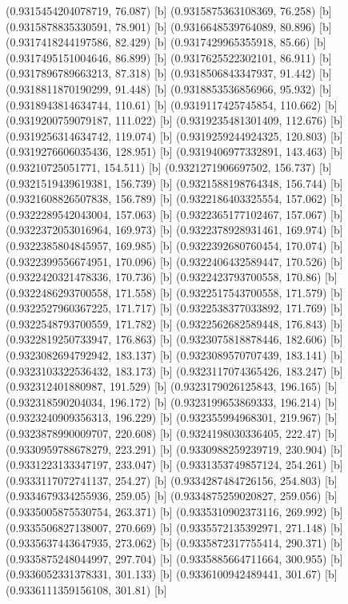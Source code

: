 {{{(0.9315454204078719, 76.087) [b] 
(0.9315875363108369, 76.258) [b] 
(0.9315878835330591, 78.901) [b] 
(0.9316648539764089, 80.896) [b] 
(0.9317418244197586, 82.429) [b] 
(0.9317429965355918, 85.66) [b] 
(0.9317495151004646, 86.899) [b] 
(0.9317625522302101, 86.911) [b] 
(0.9317896789663213, 87.318) [b] 
(0.9318506843347937, 91.442) [b] 
(0.9318811870190299, 91.448) [b] 
(0.9318853536856966, 95.932) [b] 
(0.9318943814634744, 110.61) [b] 
(0.9319117425745854, 110.662) [b] 
(0.9319200759079187, 111.022) [b] 
(0.9319235481301409, 112.676) [b] 
(0.9319256314634742, 119.074) [b] 
(0.9319259244924325, 120.803) [b] 
(0.9319276606035436, 128.951) [b] 
(0.9319406977332891, 143.463) [b] 
(0.93210725051771, 154.511) [b] 
(0.9321271906697502, 156.737) [b] 
(0.9321519439619381, 156.739) [b] 
(0.9321588198764348, 156.744) [b] 
(0.9321608826507838, 156.789) [b] 
(0.9322186403325554, 157.062) [b] 
(0.9322289542043004, 157.063) [b] 
(0.9322365177102467, 157.067) [b] 
(0.9322372053016964, 169.973) [b] 
(0.9322378928931461, 169.974) [b] 
(0.9322385804845957, 169.985) [b] 
(0.9322392680760454, 170.074) [b] 
(0.9322399556674951, 170.096) [b] 
(0.9322406432589447, 170.526) [b] 
(0.9322420321478336, 170.736) [b] 
(0.9322423793700558, 170.86) [b] 
(0.9322486293700558, 171.558) [b] 
(0.9322517543700558, 171.579) [b] 
(0.9322527960367225, 171.717) [b] 
(0.9322538377033892, 171.769) [b] 
(0.9322548793700559, 171.782) [b] 
(0.9322562682589448, 176.843) [b] 
(0.9322819250733947, 176.863) [b] 
(0.9323075818878446, 182.606) [b] 
(0.9323082694792942, 183.137) [b] 
(0.9323089570707439, 183.141) [b] 
(0.9323103322536432, 183.173) [b] 
(0.9323117074365426, 183.247) [b] 
(0.932312401880987, 191.529) [b] 
(0.9323179026125843, 196.165) [b] 
(0.932318590204034, 196.172) [b] 
(0.9323199653869333, 196.214) [b] 
(0.9323240909356313, 196.229) [b] 
(0.932355994968301, 219.967) [b] 
(0.9323878990009707, 220.608) [b] 
(0.9324198030336405, 222.47) [b] 
(0.9330959788678279, 223.291) [b] 
(0.9330988259239719, 230.904) [b] 
(0.9331223133347197, 233.047) [b] 
(0.9331353749857124, 254.261) [b] 
(0.9333117072741137, 254.27) [b] 
(0.9334287484726156, 254.803) [b] 
(0.9334679334255936, 259.05) [b] 
(0.9334875259020827, 259.056) [b] 
(0.9335005875530754, 263.371) [b] 
(0.9335310902373116, 269.992) [b] 
(0.9335506827138007, 270.669) [b] 
(0.9335572135392971, 271.148) [b] 
(0.9335637443647935, 273.062) [b] 
(0.9335872317755414, 290.371) [b] 
(0.9335875248044997, 297.704) [b] 
(0.9335885664711664, 300.955) [b] 
(0.9336052331378331, 301.133) [b] 
(0.9336100942489441, 301.67) [b] 
(0.9336111359156108, 301.81) [b] 
}}}
